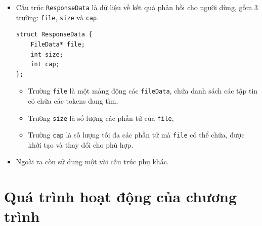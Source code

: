\documentclass[12pt,a4paper]{article}
\begin{document}
\begin{itemize}
\begin{itemize}
\end{itemize}
\item Cấu trúc \lstinline{ResponseData} là dữ liệu về kết quả phản hồi cho người dùng, gồm \(3\) trường: \lstinline{file}, \lstinline{size} và \lstinline{cap}.
\begin{lstlisting}
struct ResponseData {
	FileData* file;
	int size;
	int cap;
};
\end{lstlisting}
\begin{itemize}
\item Trường \lstinline{file} là một mảng động các \lstinline{fileData}, chứa danh sách các tập tin có chứa các tokens đang tìm,
\item Trường \lstinline{size} là số lượng các phần tử của \lstinline{file},
\item Trường \lstinline{cap} là số lượng tối đa các phần tử mà \lstinline{file} có thể chứa, được khởi tạo và thay đổi cho phù hợp.
\end{itemize}
\item Ngoài ra còn sử dụng một vài cấu trúc phụ khác.
\end{itemize}
\newpage
\section{Quá trình hoạt động của chương trình}
\end{document}
